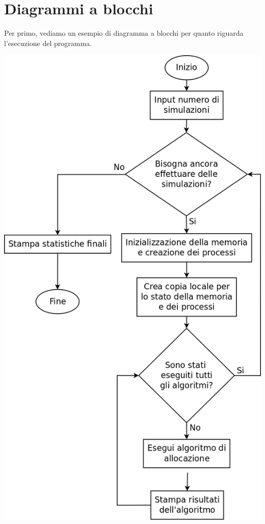 \documentclass[20pt,a4paper,oneside]{article}
\begin{document}
\section{Diagrammi a blocchi}
Per primo, vediamo un esempio di diagramma a blocchi per quanto riguarda l'esecuzione del programma.\\
\begin{center}\includegraphics[scale=0.26]{AD1}\end{center}
\end{document}
